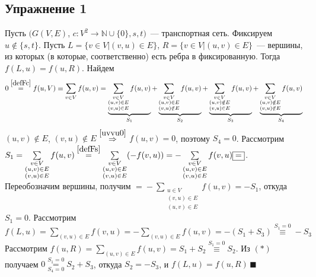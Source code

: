 \documentclass[a4paper]{article}
\newcommand{\Nz}{\mathbb{N}\cup\{0\}}
\begin{document}
\subsection*{Упражнение 1}
Пусть $(G(V,E)$, $c\colon V^2\to\Nz, s, t)$~--- транспортная сеть. Фиксируем $u\notin\{s,t\}$. Пусть $L=\{v\in V\big| (v,u)\in E\}$, $R=\{v\in V\big|(u,v)\in E\}$~--- вершины, из которых (в которые, соответственно) есть ребра в фиксированную. Тогда $f(L,u)=f(u,R)$.\newline
Найдем $$0\overset{\ref{defFc}}{=}f(u,V)\equiv\sum\limits_{v\in V}f(u,v)=
\underbrace{\sum\limits_{\substack{v\in V\\ (u,v)\in E\\ (v,u)\in E}}f(u,v)}_{S_1}+
\underbrace{\sum\limits_{\substack{v\in V\\ (u,v)\in E\\ (v,u)\notin E}}f(u,v)}_{S_2}+
\underbrace{\sum\limits_{\substack{v\in V\\ (u,v)\notin E\\ (v,u)\in E}}f(u,v)}_{S_3}+
\underbrace{\sum\limits_{\substack{v\in V\\ (u,v)\notin E\\ (v,u)\notin E}}f(u,v)}_{S_4}$$
$(u,v)\notin E$, $(v,u)\notin E$ $\overset{\ref{uvvu0}}{\Rightarrow}$ $f(u,v)=0$, поэтому $S_4=0$. Рассмотрим $S_1=\sum\limits_{\substack{v\in V\\ (u,v)\in E\\ (v,u)\in E}}f(u,v)\overset{\ref{defFs}}{=}\sum\limits_{\substack{v\in V\\ (u,v)\in E\\ (v,u)\in E}}(-f(v,u))=-\sum\limits_{\substack{v\in V\\ (u,v)\in E\\ (v,u)\in E}}f(v,u)\boxed{=}$. Переобозначим вершины, получим $\boxed{=}-\sum\limits_{\substack{u\in V\\ (v,u)\in E\\ (u,v)\in E}}f(u,v)=-S_1$, откуда $S_1=0$.\newline
Рассмотрим $f(L,u)=\sum\limits_{(v,u)\in E}f(v,u)=-\sum\limits_{(v,u)\in E}f(u,v)=-(S_1+S_3)\overset{S_1=0}{\equiv} -S_3$\newline
Рассмотрим $f(u,R)=\sum\limits_{(u,v)\in E}f(u,v)=S_1+S_2\overset{S_1=0}{\equiv}S_2$.\newline
Из $(*)$ получаем $0\overset{S_1=0}{\underset{S_4=0}{=}}S_2+S_3$, откуда $S_2=-S_3$, и $f(L,u)=f(u,R)\,\blacksquare$
\newpage
\end{document}
